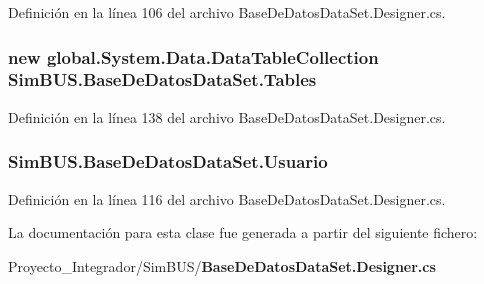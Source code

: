 Definición en la línea 106 del archivo Base\-De\-Datos\-Data\-Set.\-Designer.\-cs.

\subsubsection[{Tables}]{\setlength{\rightskip}{0pt plus 5cm}new global.\-System.\-Data.\-Data\-Table\-Collection Sim\-B\-U\-S.\-Base\-De\-Datos\-Data\-Set.\-Tables\hspace{0.3cm}{\ttfamily [get]}}\label{class_sim_b_u_s_1_1_base_de_datos_data_set_a6e60bee1128a67b84ad5700377274f05}


Definición en la línea 138 del archivo Base\-De\-Datos\-Data\-Set.\-Designer.\-cs.

\subsubsection[{Usuario}]{ Sim\-B\-U\-S.\-Base\-De\-Datos\-Data\-Set.\-Usuario\hspace{0.3cm}{\ttfamily [get]}}\label{class_sim_b_u_s_1_1_base_de_datos_data_set_a4eae4be17189baff7b58f5c1b40f2e01}


Definición en la línea 116 del archivo Base\-De\-Datos\-Data\-Set.\-Designer.\-cs.



La documentación para esta clase fue generada a partir del siguiente fichero\-:\begin{DoxyCompactItemize}
\item 
Proyecto\-\_\-\-Integrador/\-Sim\-B\-U\-S/{\bf Base\-De\-Datos\-Data\-Set.\-Designer.\-cs}\end{DoxyCompactItemize}
